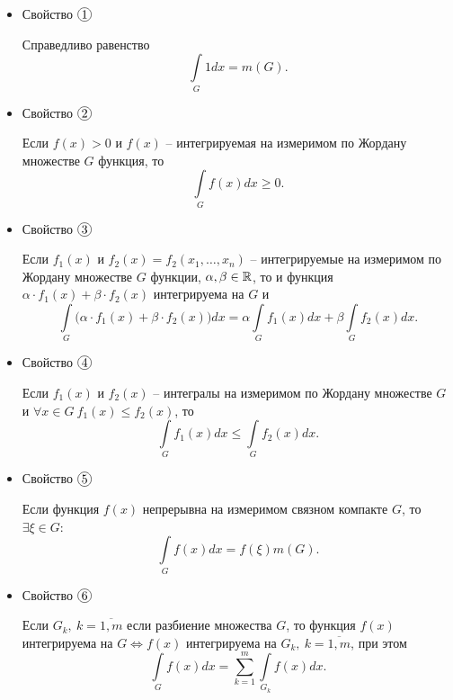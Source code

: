 \begin{itemize}
    \item Свойство $ \circled{1} $
          \begin{statement}
              Справедливо равенство
              \[
                  \underset{G}{\int}1 dx = m(G).
              \]
          \end{statement}

    \item Свойство $ \circled{2} $
          \begin{statement}
              Если $ f(x) > 0 $ и $ f(x) $ -- интегрируемая на измеримом по Жордану множестве $ G $ функция, то
              \[
                  \underset{G}{\int}f(x)dx \geqslant 0.
              \]
          \end{statement}

    \item Свойство $ \circled{3} $
          \begin{statement}
              Если $ f_1(x) $ и $ f_2(x) = f_2(x_1,\ldots,x_n) $ -- интегрируемые на измеримом по Жордану множестве $ G $ функции, $ \alpha,\beta \in \mathbb{R} $, то и функция $ \alpha \cdot f_1(x) + \beta \cdot f_2(x) $ интегрируема на $ G $ и
              \[
                  \underset{G}{\int}\big(\alpha\cdot f_1(x) + \beta \cdot f_2(x)\big)dx = \alpha \underset{G}{\int}f_1(x)dx + \beta \underset{G}{\int}f_2(x)dx.
              \]
          \end{statement}

    \item Свойство $ \circled{4} $
          \begin{statement}
              Если $ f_1(x) $ и $ f_2(x) $ -- интегралы на измеримом по Жордану множестве $ G $ и $ \forall x \in G \ f_1(x) \leqslant f_2(x) $, то
              \[
                  \underset{G}{\int} f_1(x)dx \leqslant \underset{G}{\int}f_2(x)dx.
              \]
          \end{statement}

    \item Свойство $ \circled{5} $
          \begin{statement}
              Если функция $ f(x) $ непрерывна на измеримом связном компакте $ G $, то $ \exists \xi \in G $:
              \[
                  \underset{G}{\int}f(x)dx = f(\xi)m(G).
              \]
          \end{statement}

    \item Свойство $ \circled{6} $
          \begin{statement}
              Если $ G_k, \ k = \overline{1,m} $ если разбиение множества $ G $, то функция $ f(x) $ интегрируема на $ G \iff f(x) $ интегрируема на $ G_k, \ k = \overline{1,m} $, при этом
              \[
                  \underset{G}{\int}f(x)dx = \sum_{k=1}^{m}\underset{G_k}{\int}f(x)dx.
              \]
          \end{statement}


\end{itemize}
